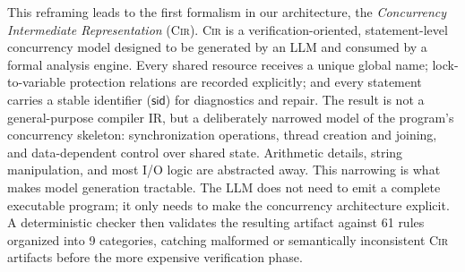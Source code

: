 This reframing leads to the first formalism in our architecture, the \emph{Concurrency Intermediate Representation} (\textsc{Cir}). \textsc{Cir} is a verification-oriented, statement-level concurrency model designed to be generated by an LLM and consumed by a formal analysis engine. Every shared resource receives a unique global name; lock-to-variable protection relations are recorded explicitly; and every statement carries a stable identifier ($\mathsf{sid}$) for diagnostics and repair. The result is not a general-purpose compiler IR, but a deliberately narrowed model of the program's concurrency skeleton: synchronization operations, thread creation and joining, and data-dependent control over shared state. Arithmetic details, string manipulation, and most I/O logic are abstracted away. This narrowing is what makes model generation tractable. The LLM does not need to emit a complete executable program; it only needs to make the concurrency architecture explicit. A deterministic checker then validates the resulting artifact against 61 rules organized into 9 categories, catching malformed or semantically inconsistent \textsc{Cir} artifacts before the more expensive verification phase.

